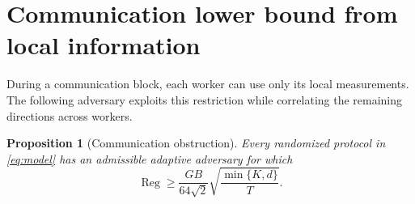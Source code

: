 \documentclass[11pt,a4paper]{article}
\numberwithin{equation}{section}
\newtheorem{proposition}[theorem]{Proposition}
\theoremstyle{remark}
\begin{document}
\section{Communication lower bound from local information}
\label{sec:local}

During a communication block, each worker can use only its local measurements. The following adversary exploits this restriction while correlating the remaining directions across workers.

\begin{proposition}[Communication obstruction]\label{prop:local}
Every randomized protocol in \eqref{eq:model} has an admissible adaptive
adversary for which
\begin{equation}
 \operatorname{Reg}\ge
 \frac{GB}{64\sqrt2}\sqrt{\frac{\min\{K,d\}}{T}}.
 \label{eq:local-lower}
\end{equation}
\end{proposition}
\end{document}
